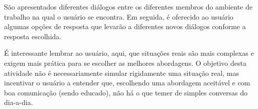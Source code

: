 \documentclass[12pt]{article}
\begin{document}
São apresentados diferentes diálogos entre os diferentes membros do ambiente de trabalho na qual o usuário se encontra. Em seguida, é oferecido ao usuário algumas opções de resposta que levarão a diferentes novos diálogos conforme a resposta escolhida.

É interessante lembrar ao usuário, aqui, que situações reais são mais complexas e exigem mais prática para se escolher as melhores abordagens. O objetivo desta atividade não é necessariamente simular rigidamente uma situação real, mas incentivar o usuário a entender que, escolhendo uma abordagem aceitável e com boa comunicação (sendo educado), não há o que temer de simples conversas do dia-a-dia.




\end{document}
